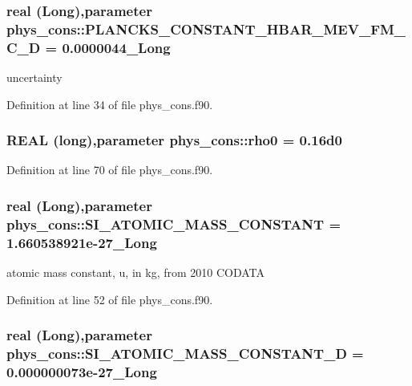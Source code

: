 \hypertarget{namespacephys__cons_a62594785e48a010b70b6d8320dc50269}{
\subsubsection[{PLANCKS\_\-CONSTANT\_\-HBAR\_\-MEV\_\-FM\_\-C\_\-D}]{\setlength{\rightskip}{0pt plus 5cm}real (Long),parameter {\bf phys\_\-cons::PLANCKS\_\-CONSTANT\_\-HBAR\_\-MEV\_\-FM\_\-C\_\-D} = 0.0000044\_\-Long}}
\label{namespacephys__cons_a62594785e48a010b70b6d8320dc50269}


uncertainty 



Definition at line 34 of file phys\_\-cons.f90.

\hypertarget{namespacephys__cons_a4b10513970a98ad78b85723c60d9a8b6}{
\subsubsection[{rho0}]{\setlength{\rightskip}{0pt plus 5cm}REAL (long),parameter {\bf phys\_\-cons::rho0} = 0.16d0}}
\label{namespacephys__cons_a4b10513970a98ad78b85723c60d9a8b6}


Definition at line 70 of file phys\_\-cons.f90.

\hypertarget{namespacephys__cons_a0a98df5d38297f3acc9d5557b4080055}{
\subsubsection[{SI\_\-ATOMIC\_\-MASS\_\-CONSTANT}]{\setlength{\rightskip}{0pt plus 5cm}real (Long),parameter {\bf phys\_\-cons::SI\_\-ATOMIC\_\-MASS\_\-CONSTANT} = 1.660538921e-\/27\_\-Long}}
\label{namespacephys__cons_a0a98df5d38297f3acc9d5557b4080055}


atomic mass constant, u, in kg, from 2010 CODATA 



Definition at line 52 of file phys\_\-cons.f90.

\hypertarget{namespacephys__cons_a6e13c059ed2f1228592194ed5f16222c}{
\subsubsection[{SI\_\-ATOMIC\_\-MASS\_\-CONSTANT\_\-D}]{\setlength{\rightskip}{0pt plus 5cm}real (Long),parameter {\bf phys\_\-cons::SI\_\-ATOMIC\_\-MASS\_\-CONSTANT\_\-D} = 0.000000073e-\/27\_\-Long}}
\label{namespacephys__cons_a6e13c059ed2f1228592194ed5f16222c}


